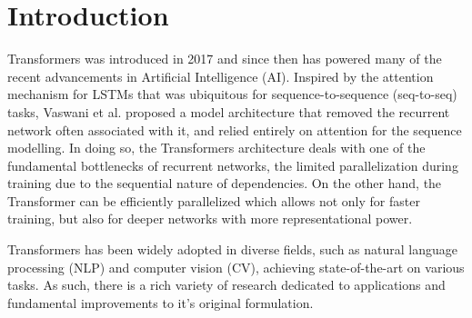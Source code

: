 \section{Introduction}

Transformers \cite{vaswani2023attention} was introduced in 2017 and since then has powered many of the recent advancements in Artificial Intelligence (AI). Inspired by the attention mechanism for LSTMs \cite{10.1162/neco.1997.9.8.1735}\cite{bahdanau2016neural}\cite{luong2015effective}\cite{kim2017structured} that was ubiquitous for sequence-to-sequence (seq-to-seq) tasks,  Vaswani et al. proposed a model architecture that removed the recurrent network often associated with it, and relied entirely on attention for the sequence modelling. In doing so, the Transformers architecture deals with one of the fundamental bottlenecks of recurrent networks, the limited parallelization during training due to the sequential nature of dependencies. On the other hand, the Transformer can be efficiently parallelized which allows not only for faster training, but also for deeper networks with more representational power. 

Transformers has been widely adopted in diverse fields,
such as natural language processing (NLP) and computer vision (CV), achieving state-of-the-art on various tasks. As such, there is a rich variety of research dedicated to applications and fundamental improvements to it's original formulation.